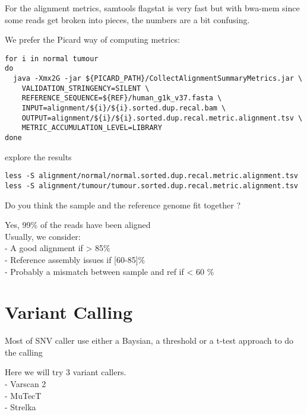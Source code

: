 For the alignment metrics, samtools flagstat is very fast but with bwa-mem since some reads get broken into pieces, the numbers are a bit confusing. 

We prefer the Picard way of computing metrics:
\begin{lstlisting}
for i in normal tumour
do
  java -Xmx2G -jar ${PICARD_PATH}/CollectAlignmentSummaryMetrics.jar \
    VALIDATION_STRINGENCY=SILENT \
    REFERENCE_SEQUENCE=${REF}/human_g1k_v37.fasta \
    INPUT=alignment/${i}/${i}.sorted.dup.recal.bam \
    OUTPUT=alignment/${i}/${i}.sorted.dup.recal.metric.alignment.tsv \
    METRIC_ACCUMULATION_LEVEL=LIBRARY
done
\end{lstlisting}

explore the results

\begin{lstlisting}
less -S alignment/normal/normal.sorted.dup.recal.metric.alignment.tsv
less -S alignment/tumour/tumour.sorted.dup.recal.metric.alignment.tsv

\end{lstlisting}

\begin{questions}
Do you think the sample and the reference genome fit together ?
\end{questions}
\begin{answer}
Yes, 99\% of the reads have been aligned \\
Usually, we consider:  \\
   - A good alignment if > 85\% \\
   - Reference assembly issues if [60-85]\% \\
   - Probably a mismatch between sample and ref if < 60 \%
\end{answer}




\newpage


\section{Variant Calling}

Most of SNV caller use either a Baysian, a threshold or a t-test approach to do the calling

 Here we will try 3 variant callers.\\
- Varscan 2 \\
- MuTecT \\
- Strelka

